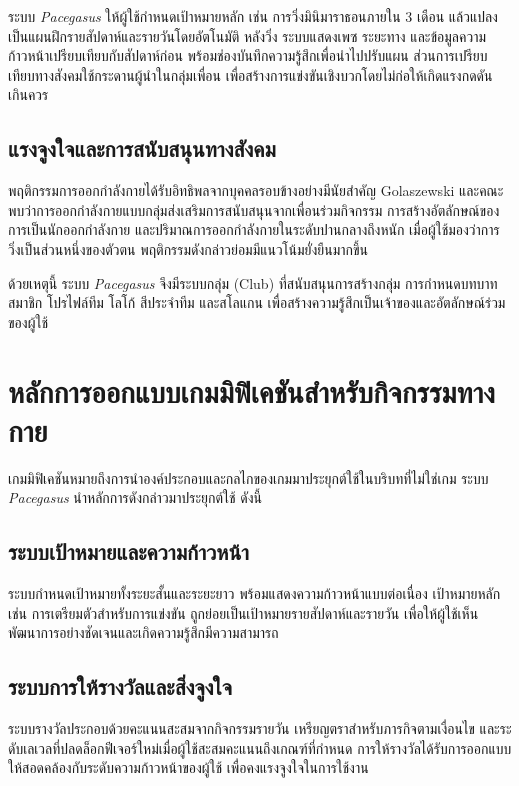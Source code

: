 ระบบ \textit{Pacegasus} ให้ผู้ใช้กำหนดเป้าหมายหลัก เช่น การวิ่งมินิมาราธอนภายใน 3 เดือน แล้วแปลงเป็นแผนฝึกรายสัปดาห์และรายวันโดยอัตโนมัติ หลังวิ่ง ระบบแสดงเพซ ระยะทาง และข้อมูลความก้าวหน้าเปรียบเทียบกับสัปดาห์ก่อน พร้อมช่องบันทึกความรู้สึกเพื่อนำไปปรับแผน ส่วนการเปรียบเทียบทางสังคมใช้กระดานผู้นำในกลุ่มเพื่อน เพื่อสร้างการแข่งขันเชิงบวกโดยไม่ก่อให้เกิดแรงกดดันเกินควร

\subsection{แรงจูงใจและการสนับสนุนทางสังคม}

พฤติกรรมการออกกำลังกายได้รับอิทธิพลจากบุคคลรอบข้างอย่างมีนัยสำคัญ Golaszewski และคณะ \cite{golaszewski2022} พบว่าการออกกำลังกายแบบกลุ่มส่งเสริมการสนับสนุนจากเพื่อนร่วมกิจกรรม การสร้างอัตลักษณ์ของการเป็นนักออกกำลังกาย และปริมาณการออกกำลังกายในระดับปานกลางถึงหนัก เมื่อผู้ใช้มองว่าการวิ่งเป็นส่วนหนึ่งของตัวตน พฤติกรรมดังกล่าวย่อมมีแนวโน้มยั่งยืนมากขึ้น

ด้วยเหตุนี้ ระบบ \textit{Pacegasus} จึงมีระบบกลุ่ม (Club) ที่สนับสนุนการสร้างกลุ่ม การกำหนดบทบาทสมาชิก โปรไฟล์ทีม โลโก้ สีประจำทีม และสโลแกน เพื่อสร้างความรู้สึกเป็นเจ้าของและอัตลักษณ์ร่วมของผู้ใช้

\section{หลักการออกแบบเกมมิฟิเคชันสำหรับกิจกรรมทางกาย}

เกมมิฟิเคชันหมายถึงการนำองค์ประกอบและกลไกของเกมมาประยุกต์ใช้ในบริบทที่ไม่ใช่เกม \cite{fu2024} ระบบ \textit{Pacegasus} นำหลักการดังกล่าวมาประยุกต์ใช้ ดังนี้

\subsection{ระบบเป้าหมายและความก้าวหน้า}

ระบบกำหนดเป้าหมายทั้งระยะสั้นและระยะยาว พร้อมแสดงความก้าวหน้าแบบต่อเนื่อง เป้าหมายหลัก เช่น การเตรียมตัวสำหรับการแข่งขัน ถูกย่อยเป็นเป้าหมายรายสัปดาห์และรายวัน เพื่อให้ผู้ใช้เห็นพัฒนาการอย่างชัดเจนและเกิดความรู้สึกมีความสามารถ

\subsection{ระบบการให้รางวัลและสิ่งจูงใจ}

ระบบรางวัลประกอบด้วยคะแนนสะสมจากกิจกรรมรายวัน เหรียญตราสำหรับภารกิจตามเงื่อนไข และระดับเลเวลที่ปลดล็อกฟีเจอร์ใหม่เมื่อผู้ใช้สะสมคะแนนถึงเกณฑ์ที่กำหนด การให้รางวัลได้รับการออกแบบให้สอดคล้องกับระดับความก้าวหน้าของผู้ใช้ เพื่อคงแรงจูงใจในการใช้งาน \cite{milneives2023}


